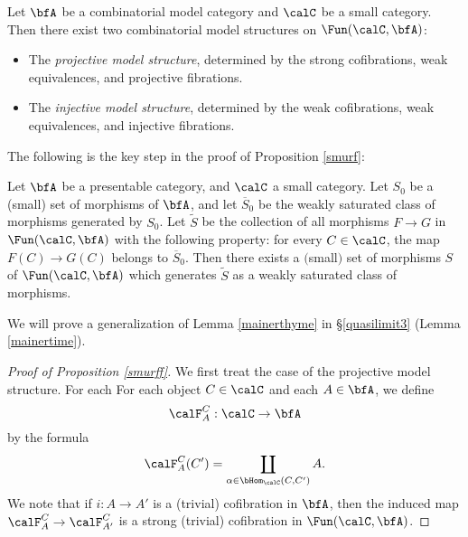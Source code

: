 \begin{Model Categories}
\begin{Didn't Read}
\begin{proposition}\label{smurff}
Let $\bfA$ be a combinatorial model category and $\calC$
be a small category. Then there exist two combinatorial model structures on $\Fun(\calC, \bfA)$:

\begin{itemize}
\item The {\it projective model structure}, determined by the strong
cofibrations, weak equivalences, and projective fibrations.

\item The {\it injective model structure}, determined by the weak
cofibrations, weak equivalences, and injective fibrations.
\end{itemize}
\end{proposition}

The following is the key step in the proof of Proposition \ref{smurf}:

\begin{lemma}\label{mainerthyme}
Let $\bfA$ be a presentable category, and $\calC$ a small category. Let $S_0$ be a (small) set of morphisms of $\bfA$, and let $\overline{S}_0$ be the weakly saturated class of morphisms generated by $S_0$. Let $\widetilde{S}$ be the collection of all morphisms $F \rightarrow G$ in $\Fun(\calC, \bfA)$ with the following property: for every $C \in \calC$, the map $F(C) \rightarrow G(C)$ belongs to $\overline{S}_0$. Then there exists a $($small$)$ set of morphisms $S$ of $\Fun(\calC, \bfA)$ which generates $\widetilde{S}$ as a weakly saturated class of morphisms.
\end{lemma}

We will prove a generalization of Lemma \ref{mainerthyme} in \S \ref{quasilimit3}
(Lemma \ref{mainertime}).

\begin{proof}[Proof of Proposition \ref{smurff}]
We first treat the case of the projective model structure. For each
For each object $C \in \calC$ and each $A \in \bfA$, we define 
$$\calF^C_A: \calC \rightarrow \bfA$$
by the formula
$$\calF^C_A(C') = \coprod_{ \alpha \in \bHom_{\calC}(C,C') } A.$$
We note that if $i: A \rightarrow A'$ is a (trivial) cofibration in $\bfA$, then the induced map
$\calF^C_{A} \rightarrow \calF^C_{A'}$ is a strong (trivial) cofibration in $\Fun(\calC, \bfA)$. 


\end{proof}
\end{Didn't Read}
\end{Model Categories}
